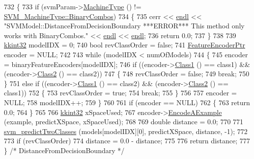 \begin{DoxyCode}
732 \{
733   \textcolor{keywordflow}{if}  (svmParam->\hyperlink{class_k_k_m_l_l_1_1_s_v_mparam_a30153e00007f9cf65343e0ad97ad61fb}{MachineType} () != \hyperlink{namespace_k_k_m_l_l_ad917464bc631109a3021cf02cd27af9aa01ad67463554c5f5552dcc6b5f4a553f}{SVM\_MachineType::BinaryCombos})
734   \{
735     cerr << \hyperlink{namespace_k_k_b_ad1f50f65af6adc8fa9e6f62d007818a8}{endl} << \textcolor{stringliteral}{"SVMModel::DistanceFromDecisionBoundary   ***ERROR***    This method only works
       with BinaryCombos."} << \hyperlink{namespace_k_k_b_ad1f50f65af6adc8fa9e6f62d007818a8}{endl} << \hyperlink{namespace_k_k_b_ad1f50f65af6adc8fa9e6f62d007818a8}{endl};
736     \textcolor{keywordflow}{return}  0.0;
737   \}
738 
739   \hyperlink{namespace_k_k_b_a8fa4952cc84fda1de4bec1fbdd8d5b1b}{kkint32}  modelIDX = 0;
740   \textcolor{keywordtype}{bool}  revClassOrder = \textcolor{keyword}{false};
741   \hyperlink{class_k_k_m_l_l_1_1_feature_encoder}{FeatureEncoderPtr}  encoder  = NULL;
742 
743   \textcolor{keywordflow}{while}  (modelIDX < numOfModels)
744   \{
745     encoder = binaryFeatureEncoders[modelIDX];
746     \textcolor{keywordflow}{if}  ((encoder->\hyperlink{class_k_k_m_l_l_1_1_feature_encoder_a397e19999f5572120b55038835614162}{Class1} () == class1)  &&  (encoder->\hyperlink{class_k_k_m_l_l_1_1_feature_encoder_a70eb189a61d27c7c513085274a7edd75}{Class2} () == class2))
747     \{
748       revClassOrder = \textcolor{keyword}{false};
749       \textcolor{keywordflow}{break};
750     \}
751     \textcolor{keywordflow}{else} \textcolor{keywordflow}{if}  ((encoder->\hyperlink{class_k_k_m_l_l_1_1_feature_encoder_a397e19999f5572120b55038835614162}{Class1} () == class2)  &&  (encoder->\hyperlink{class_k_k_m_l_l_1_1_feature_encoder_a70eb189a61d27c7c513085274a7edd75}{Class2} () == class1))
752     \{
753       revClassOrder = \textcolor{keyword}{true};
754       \textcolor{keywordflow}{break};
755     \}
756 
757     encoder = NULL;
758     modelIDX++;
759   \}
760 
761   \textcolor{keywordflow}{if}  (encoder == NULL)
762   \{
763     \textcolor{keywordflow}{return} 0.0;
764   \}
765 
766   \hyperlink{namespace_k_k_b_a8fa4952cc84fda1de4bec1fbdd8d5b1b}{kkint32}  xSpaceUsed;
767   encoder->\hyperlink{class_k_k_m_l_l_1_1_feature_encoder_af82278dec57d34f3ebcf6ea97cc625d2}{EncodeAExample} (example, predictXSpace, xSpaceUsed);
768 
769   \textcolor{keywordtype}{double}  distance = 0.0;
770 
771   \hyperlink{namespace_s_v_m233_a558a3dbd2873b3211831500197cc7a59}{svm\_predictTwoClasses} (models[modelIDX][0], predictXSpace, distance, -1);
772 
773   \textcolor{keywordflow}{if}  (revClassOrder)
774     distance = 0.0 - distance;
775 
776   \textcolor{keywordflow}{return}  distance;
777 \}  \textcolor{comment}{/* DistanceFromDecisionBoundary */}
\end{DoxyCode}
